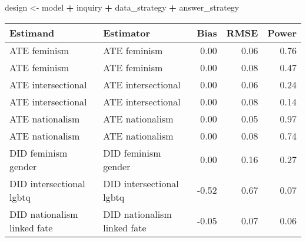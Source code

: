 \documentclass[
]{article}
\newenvironment{Shaded}{\begin{snugshade}}{\end{snugshade}}
\newcommand{\NormalTok}[1]{#1}
\newcommand{\OperatorTok}[1]{\textcolor[rgb]{0.81,0.36,0.00}{\textbf{#1}}}
\newcommand{\StringTok}[1]{\textcolor[rgb]{0.31,0.60,0.02}{#1}}
\begin{document}
\begin{Shaded}
\begin{Highlighting}[]
\NormalTok{design <-}\StringTok{ }\NormalTok{model }\OperatorTok{+}\StringTok{ }\NormalTok{inquiry }\OperatorTok{+}\StringTok{ }\NormalTok{data_strategy }\OperatorTok{+}\StringTok{ }\NormalTok{answer_strategy}
\end{Highlighting}
\end{Shaded}

\begin{tabular}{l|l|r|r|r}
\hline
Estimand & Estimator & Bias & RMSE & Power\\
\hline
ATE feminism & ATE feminism & 0.00 & 0.06 & 0.76\\
\hline
ATE feminism & ATE feminism & 0.00 & 0.08 & 0.47\\
\hline
ATE intersectional & ATE intersectional & 0.00 & 0.06 & 0.24\\
\hline
ATE intersectional & ATE intersectional & 0.00 & 0.08 & 0.14\\
\hline
ATE nationalism & ATE nationalism & 0.00 & 0.05 & 0.97\\
\hline
ATE nationalism & ATE nationalism & 0.00 & 0.08 & 0.74\\
\hline
DID feminism gender & DID feminism gender & 0.00 & 0.16 & 0.27\\
\hline
DID intersectional lgbtq & DID intersectional lgbtq & -0.52 & 0.67 & 0.07\\
\hline
DID nationalism linked fate & DID nationalism linked fate & -0.05 & 0.07 & 0.06\\
\hline
\end{tabular}
\end{document}

